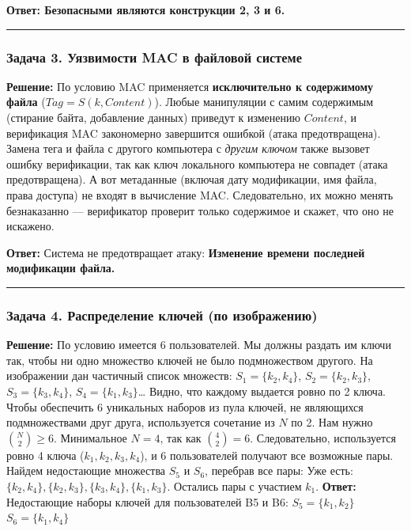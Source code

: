 ﻿\documentclass[9pt,a4paper]{extarticle}
\begin{document}
\textbf{Ответ: Безопасными являются конструкции 2, 3 и 6.}

\begin{center}\rule{0.5\linewidth}{0.5pt}\end{center}

\subsubsection{Задача 3. Уязвимости MAC в файловой системе}\label{ux437ux430ux434ux430ux447ux430-3.-ux443ux44fux437ux432ux438ux43cux43eux441ux442ux438-mac-ux432-ux444ux430ux439ux43bux43eux432ux43eux439-ux441ux438ux441ux442ux435ux43cux435}

\textbf{Решение:} По условию MAC применяется \textbf{исключительно к содержимому файла} (\(Tag = S(k, Content)\)). Любые манипуляции с самим содержимым (стирание байта, добавление данных) приведут к изменению \(Content\), и верификация MAC закономерно завершится ошибкой (атака предотвращена). Замена тега и файла с другого компьютера с \emph{другим ключом} также вызовет ошибку верификации, так как ключ локального компьютера не совпадет (атака предотвращена). А вот метаданные (включая дату модификации, имя файла, права доступа) не входят в вычисление MAC. Следовательно, их можно менять безнаказанно --- верификатор проверит только содержимое и скажет, что оно не искажено.

\textbf{Ответ:} Система не предотвращает атаку: \textbf{Изменение времени последней модификации файла.}

\begin{center}\rule{0.5\linewidth}{0.5pt}\end{center}

\subsubsection{Задача 4. Распределение ключей (по изображению)}\label{ux437ux430ux434ux430ux447ux430-4.-ux440ux430ux441ux43fux440ux435ux434ux435ux43bux435ux43dux438ux435-ux43aux43bux44eux447ux435ux439-ux43fux43e-ux438ux437ux43eux431ux440ux430ux436ux435ux43dux438ux44e}

\textbf{Решение:} По условию имеется 6 пользователей. Мы должны раздать им ключи так, чтобы ни одно множество ключей не было подмножеством другого. На изображении дан частичный список множеств: \(S_1 = \{k_2, k_4\}\), \(S_2 = \{k_2, k_3\}\), \(S_3 = \{k_3, k_4\}\), \(S_4 = \{k_1, k_3\}\)\ldots{} Видно, что каждому выдается ровно по 2 ключа. Чтобы обеспечить 6 уникальных наборов из пула ключей, не являющихся подмножествами друг друга, используется сочетание из \(N\) по 2. Нам нужно \(\binom{N}{2} \ge 6\). Минимальное \(N=4\), так как \(\binom{4}{2} = 6\). Следовательно, используется ровно 4 ключа (\(k_1, k_2, k_3, k_4\)), и 6 пользователей получают все возможные пары. Найдем недостающие множества \(S_5\) и \(S_6\), перебрав все пары: Уже есть: \(\{k_2, k_4\}, \{k_2, k_3\}, \{k_3, k_4\}, \{k_1, k_3\}\). Остались пары с участием \(k_1\). \textbf{Ответ:} Недостающие наборы ключей для пользователей B5 и B6: \textbf{\(S_5 = \{k_1, k_2\}\)} \textbf{\(S_6 = \{k_1, k_4\}\)}
\end{document}
